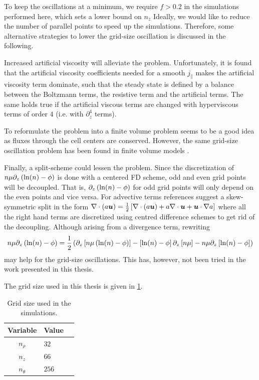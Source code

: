 To keep the oscillations at a minimum, we require $f > 0.2$ in the simulations performed here, which sets a lower bound on $n_z$
Ideally, we would like to reduce the number of parallel points to speed up the simulations.
Therefore, some alternative strategies to lower the grid-size oscillation is discussed in the following.

Increased artificial viscosity will alleviate the problem.
Unfortunately, it is found that the artificial viscosity coefficients needed for a smooth $j_\|$ makes the artificial viscosity term dominate, such that the steady state is defined by a balance between the Boltzmann terms, the resistive term and the artificial terms.
The same holds true if the artificial viscous terms are changed with hyperviscous terms of order $4$ (i.e. with $\partial_z^4$ terms).

To reformulate the problem into a finite volume problem seems to be a good idea as fluxes through the cell centers are conserved.
However, the same grid-size oscillation problem has been found in finite volume models \cite{Dudson2017Private}.

Finally, a split-scheme could lessen the problem.
Since the discretization of $n\mu\partial_z\left(\ln(n)-\phi\right)$ is done with a centered FD scheme, odd and even grid points will be decoupled.
That is, $\partial_z\left(\ln(n)-\phi\right)$ for odd grid points will only depend on the even points and vice versa.
For advective terms references \cite{Honein2004,Pirozzoli2011} suggest a skew-symmetric split in the form $\nabla\cdot\left(a\boldsymbol{u}\right) = \frac{1}{2}\left[\nabla\cdot\left(a\boldsymbol{u}\right) + a\nabla\cdot\boldsymbol{u} + \boldsymbol{u}\cdot\nabla a\right]$ where all the right hand terms are discretized using centred difference schemes to get rid of the decoupling.
Although arising from a divergence term, rewriting
%
\begin{align*}
    n\mu\partial_z\left(\ln(n)-\phi\right) =
    \frac{1}{2}\left(
    \partial_z\left[n\mu\left(\ln(n)-\phi\right)\right]-\left[\ln(n)-\phi\right]\partial_z\left[n\mu\right]
    - n\mu\partial_z\left[\ln(n)-\phi\right]
    \right)
\end{align*}
%
may help for the grid-size oscillations.
This has, however, not been tried in the work presented in this thesis.

The grid size used in this thesis is given in \cref{tb:grid}.
%
\begin{table}[!htb]
      \centering
      \caption{Grid size used in the simulations.}
        \begin{tabular}{c|ll}
        \hline\hline
        Variable & Value \\
        \hline
        $n_\rho$   & $32$  \\
        $n_z$      & $66$  \\
        $n_\theta$ & $256$ \\
        \hline\hline
        \end{tabular}
        \label{tb:grid}
\end{table}

